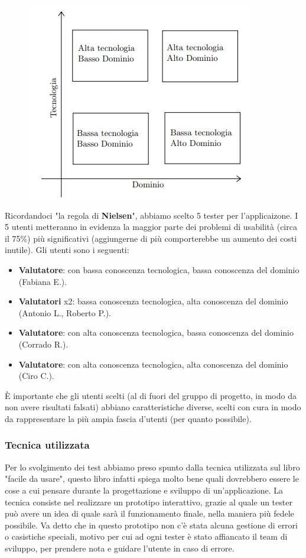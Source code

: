 \begin{figure}[H]
  \centering
  \includegraphics[scale=0.7]{img/varie/valutatori.jpeg}
\end{figure}
Ricordandoci "la regola di \textbf{Nielsen}", abbiamo scelto 5 tester per l'applicaizone. I 5 utenti metteranno in evidenza la maggior parte dei problemi di usabilità (circa il 75\%) più significativi (aggiungerne di più comporterebbe un aumento dei costi inutile). Gli utenti sono i seguenti:
\begin{itemize}
  \item \textbf{Valutatore}: con bassa conoscenza tecnologica, bassa conoscenza del dominio (Fabiana E.).
  \item \textbf{Valutatori} x2: bassa conoscenza tecnologica, alta conoscenza del dominio
        \subitem (Antonio L., Roberto P.).
  \item \textbf{Valutatore}: con alta conoscenza tecnologica, bassa conoscenza del dominio (Corrado R.).
  \item \textbf{Valutatore}: con alta conoscenza tecnologica, alta conoscenza del dominio (Ciro C.).
\end{itemize}
\`{E} importante che gli utenti scelti (al di fuori del gruppo di progetto, in modo da non avere risultati falsati) abbiano caratteristiche diverse, scelti con cura in modo da rappresentare la più ampia fascia d'utenti (per quanto possibile).
\newpage
\subsubsection{Tecnica utilizzata}
Per lo svolgimento dei test abbiamo preso spunto dalla tecnica utilizzata sul libro "facile da usare", questo libro infatti spiega molto bene quali dovrebbero essere le cose a cui pensare durante la progettazione e sviluppo di un'applicazione. La tecnica consiste nel realizzare un prototipo interattivo, grazie al quale un tester può avere un idea di quale sarà il funzionamento finale, nella maniera più fedele possibile. Va detto che in questo prototipo non c'è stata alcuna gestione di errori o casistiche speciali, motivo per cui ad ogni tester è stato affiancato il team di sviluppo, per prendere nota e guidare l'utente in caso di errore.
